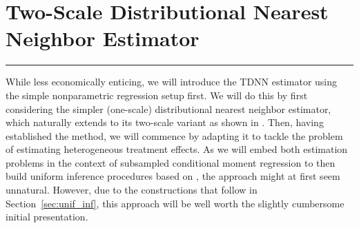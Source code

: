 \section{Two-Scale Distributional Nearest Neighbor Estimator}\label{sec:TDNN}
\hrule
While less economically enticing, we will introduce the TDNN estimator using the simple nonparametric regression setup first.
We will do this by first considering the simpler (one-scale) distributional nearest neighbor estimator, which naturally extends to its two-scale variant as shown in \citet{demirkaya_optimal_2024}.
Then, having established the method, we will commence by adapting it to tackle the problem of estimating heterogeneous treatment effects.
As we will embed both estimation problems in the context of subsampled conditional moment regression to then build uniform inference procedures based on \citet{ritzwoller_simultaneous_2024}, the approach might at first seem unnatural.
However, due to the constructions that follow in Section~\ref{sec:unif_inf}, this approach will be well worth the slightly cumbersome initial presentation.

